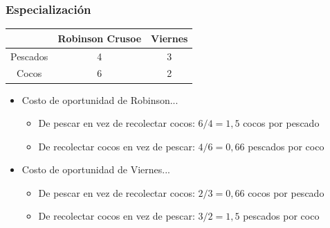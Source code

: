 \documentclass{beamer}
\begin{document}
\begin{frame}
\frametitle{Especialización}

    \centering \vspace{1mm}
    \renewcommand{\arraystretch}{1.2}
    \begin{tabular}{|c|c|c|} \hline
    \rowcolor{blue!20} 
    & \textbf{Robinson Crusoe} & \textbf{Viernes} \\ \hline
    Pescados   & 4 & 3 \\ \hline
    Cocos   & 6 & 2 \\ \hline     
    \end{tabular}
    \vspace{3mm} 
\begin{itemize}
    \item Costo de oportunidad de Robinson... \pause
        \begin{itemize}
        \item De pescar en vez de recolectar cocos: $ 6/4 = 1,5 $ cocos por pescado \pause
        \item De recolectar cocos en vez de pescar: $ 4/6 =0,66 $ pescados por coco \pause
        \end{itemize}
        \vspace{2mm}
    \item Costo de oportunidad de Viernes... \pause
        \begin{itemize}
        \item De pescar en vez de recolectar cocos: $ 2/3 = 0,66 $ cocos por pescado \pause
        \item De recolectar cocos en vez de pescar: $ 3/2 = 1,5 $ pescados por coco
        \end{itemize}
\end{itemize}
\end{frame}
\end{document}
